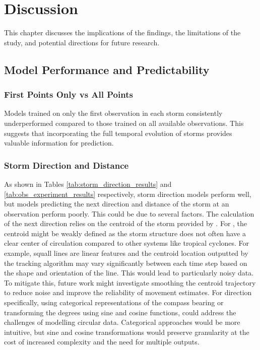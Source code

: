 \chapter{Discussion}
\label{ch:discuss}

This chapter discusses the implications of the findings, the limitations of the study, and potential directions for future research.

\section{Model Performance and Predictability}

\subsection{First Points Only vs All Points}

Models trained on only the first observation in each storm consistently underperformed compared to those trained on all available observations. This suggests that incorporating the full temporal evolution of storms provides valuable information for prediction.

\subsection{Storm Direction and Distance}

As shown in Tables \ref{tab:storm_direction_results} and \ref{tab:obs_experiment_results} respectively, storm direction models perform well, but models predicting the next direction and distance of the storm at an observation perform poorly. This could be due to several factors. The calculation of the next direction relies on the centroid of the storm provided by \cite{Hill2023}. For , the centroid might be weakly defined as the storm structure does not often have a clear center of circulation compared to other systems like tropical cyclones. For example, squall lines are linear features and the centroid location outputted by the tracking algorithm may vary significantly between each time step based on the shape and orientation of the line. This would lead to particularly noisy data. To mitigate this, future work might investigate smoothing the centroid trajectory to reduce noise and improve the reliability of movement estimates. For direction specifically, using categorical representations of the compass bearing or transforming the degrees using sine and cosine functions, could address the challenges of modelling circular data. Categorical approaches would be more intuitive, but sine and cosine transformations would preserve granularity at the cost of increased complexity and the need for multiple outputs.

